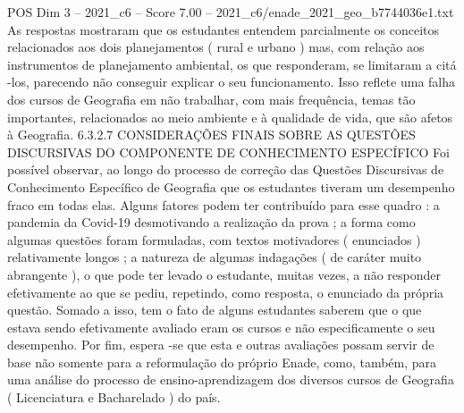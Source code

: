 \begin{textsample}{POS Dim 3 – 2021\_c6 – Score 7.00 – 2021\_c6/enade\_2021\_geo\_b7744036e1.txt}
As respostas mostraram que os estudantes entendem parcialmente os conceitos relacionados aos dois planejamentos ( rural e urbano ) mas, com relação aos instrumentos de planejamento ambiental, os que responderam, se limitaram a citá -los, parecendo não conseguir explicar o seu funcionamento.
Isso reflete uma falha dos cursos de Geografia em não trabalhar, com mais frequência, temas tão importantes, relacionados ao meio ambiente e à qualidade de vida, que são afetos à Geografia. 6.3.2.7 CONSIDERAÇÕES FINAIS SOBRE AS QUESTÕES DISCURSIVAS DO COMPONENTE DE CONHECIMENTO ESPECÍFICO Foi possível observar, ao longo do processo de correção das Questões Discursivas de Conhecimento Específico de Geografia que os estudantes tiveram um desempenho fraco em todas elas.
Alguns fatores podem ter contribuído para esse quadro : a pandemia da Covid-19 desmotivando a realização da prova ; a forma como algumas questões foram formuladas, com textos motivadores ( enunciados ) relativamente longos ; a natureza de algumas indagações ( de caráter muito abrangente ), o que pode ter levado o estudante, muitas vezes, a não responder efetivamente ao que se pediu, repetindo, como resposta, o enunciado da própria questão.
Somado a isso, tem o fato de alguns estudantes saberem que o que estava sendo efetivamente avaliado eram os cursos e não especificamente o seu desempenho.
Por fim, espera -se que esta e outras avaliações possam servir de base não somente para a reformulação do próprio Enade, como, também, para uma análise do processo de ensino-aprendizagem dos diversos cursos de Geografia ( Licenciatura e Bacharelado ) do país.

\end{textsample}
